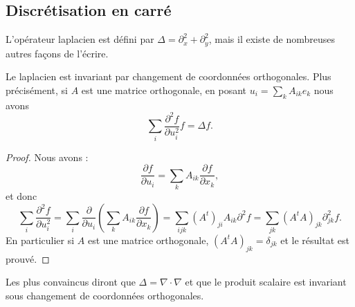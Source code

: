\subsection{Discrétisation en carré}

L'opérateur laplacien est défini par \( \Delta=\partial_x^2+\partial_y^2\), mais il existe de nombreuses autres façons de l'écrire.

\begin{lemma}
    Le laplacien est invariant par changement de coordonnées orthogonales. Plus précisément, si \( A\) est une matrice orthogonale, en posant \( u_i=\sum_kA_{ik}e_k\) nous avons
    \begin{equation}
        \sum_i\frac{ \partial^2f }{ \partial u_i^2 }f=\Delta f.
    \end{equation}
\end{lemma}

\begin{proof}
Nous avons :
\begin{equation}
    \frac{ \partial f }{ \partial u_i }=\sum_kA_{ik}\frac{ \partial f }{ \partial x_k },
\end{equation}
et donc
\begin{equation}
    \sum_i\frac{ \partial^2f }{ \partial u_i^2 }=\sum_i\frac{ \partial  }{ \partial u_i }\left( \sum_kA_{ik}\frac{ \partial f }{ \partial x_k } \right)=\sum_{ijk}(A^t)_{ji}A_{ik}\partial^2f=\sum_{jk}(A^tA)_{jk}\partial^2_{jk}f.
\end{equation}
En particulier si \( A\) est une matrice orthogonale, \( (A^tA)_{jk}=\delta_{jk}\) et le résultat est prouvé.
\end{proof}

Les plus convaincus diront que \( \Delta=\nabla\cdot\nabla\) et que le produit scalaire est invariant sous changement de coordonnées orthogonales.


